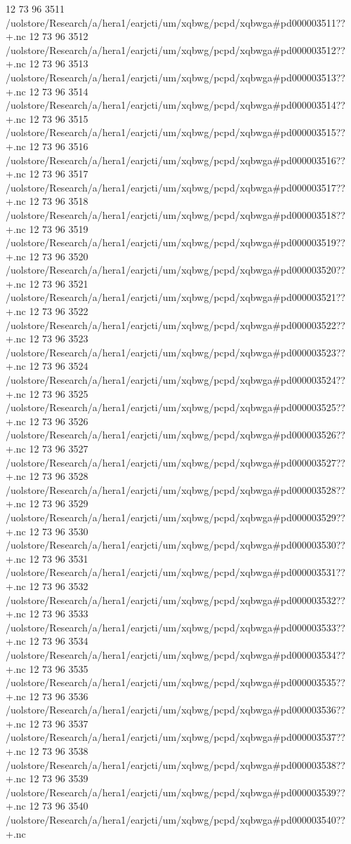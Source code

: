 12 73 96
3511
/uolstore/Research/a/hera1/earjcti/um/xqbwg/pcpd/xqbwga#pd000003511??+.nc
12 73 96
3512
/uolstore/Research/a/hera1/earjcti/um/xqbwg/pcpd/xqbwga#pd000003512??+.nc
12 73 96
3513
/uolstore/Research/a/hera1/earjcti/um/xqbwg/pcpd/xqbwga#pd000003513??+.nc
12 73 96
3514
/uolstore/Research/a/hera1/earjcti/um/xqbwg/pcpd/xqbwga#pd000003514??+.nc
12 73 96
3515
/uolstore/Research/a/hera1/earjcti/um/xqbwg/pcpd/xqbwga#pd000003515??+.nc
12 73 96
3516
/uolstore/Research/a/hera1/earjcti/um/xqbwg/pcpd/xqbwga#pd000003516??+.nc
12 73 96
3517
/uolstore/Research/a/hera1/earjcti/um/xqbwg/pcpd/xqbwga#pd000003517??+.nc
12 73 96
3518
/uolstore/Research/a/hera1/earjcti/um/xqbwg/pcpd/xqbwga#pd000003518??+.nc
12 73 96
3519
/uolstore/Research/a/hera1/earjcti/um/xqbwg/pcpd/xqbwga#pd000003519??+.nc
12 73 96
3520
/uolstore/Research/a/hera1/earjcti/um/xqbwg/pcpd/xqbwga#pd000003520??+.nc
12 73 96
3521
/uolstore/Research/a/hera1/earjcti/um/xqbwg/pcpd/xqbwga#pd000003521??+.nc
12 73 96
3522
/uolstore/Research/a/hera1/earjcti/um/xqbwg/pcpd/xqbwga#pd000003522??+.nc
12 73 96
3523
/uolstore/Research/a/hera1/earjcti/um/xqbwg/pcpd/xqbwga#pd000003523??+.nc
12 73 96
3524
/uolstore/Research/a/hera1/earjcti/um/xqbwg/pcpd/xqbwga#pd000003524??+.nc
12 73 96
3525
/uolstore/Research/a/hera1/earjcti/um/xqbwg/pcpd/xqbwga#pd000003525??+.nc
12 73 96
3526
/uolstore/Research/a/hera1/earjcti/um/xqbwg/pcpd/xqbwga#pd000003526??+.nc
12 73 96
3527
/uolstore/Research/a/hera1/earjcti/um/xqbwg/pcpd/xqbwga#pd000003527??+.nc
12 73 96
3528
/uolstore/Research/a/hera1/earjcti/um/xqbwg/pcpd/xqbwga#pd000003528??+.nc
12 73 96
3529
/uolstore/Research/a/hera1/earjcti/um/xqbwg/pcpd/xqbwga#pd000003529??+.nc
12 73 96
3530
/uolstore/Research/a/hera1/earjcti/um/xqbwg/pcpd/xqbwga#pd000003530??+.nc
12 73 96
3531
/uolstore/Research/a/hera1/earjcti/um/xqbwg/pcpd/xqbwga#pd000003531??+.nc
12 73 96
3532
/uolstore/Research/a/hera1/earjcti/um/xqbwg/pcpd/xqbwga#pd000003532??+.nc
12 73 96
3533
/uolstore/Research/a/hera1/earjcti/um/xqbwg/pcpd/xqbwga#pd000003533??+.nc
12 73 96
3534
/uolstore/Research/a/hera1/earjcti/um/xqbwg/pcpd/xqbwga#pd000003534??+.nc
12 73 96
3535
/uolstore/Research/a/hera1/earjcti/um/xqbwg/pcpd/xqbwga#pd000003535??+.nc
12 73 96
3536
/uolstore/Research/a/hera1/earjcti/um/xqbwg/pcpd/xqbwga#pd000003536??+.nc
12 73 96
3537
/uolstore/Research/a/hera1/earjcti/um/xqbwg/pcpd/xqbwga#pd000003537??+.nc
12 73 96
3538
/uolstore/Research/a/hera1/earjcti/um/xqbwg/pcpd/xqbwga#pd000003538??+.nc
12 73 96
3539
/uolstore/Research/a/hera1/earjcti/um/xqbwg/pcpd/xqbwga#pd000003539??+.nc
12 73 96
3540
/uolstore/Research/a/hera1/earjcti/um/xqbwg/pcpd/xqbwga#pd000003540??+.nc
